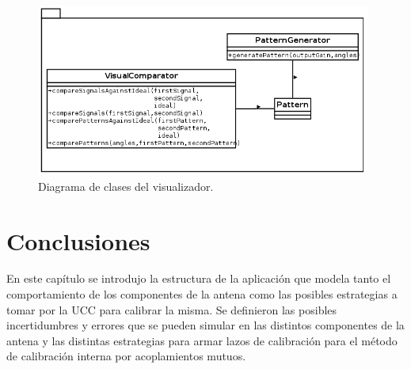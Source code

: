 \begin{figure}[H]
 \centering
 \includegraphics[width=11cm]{gfx/visualPackage.png}
 \caption{Diagrama de clases del visualizador.}
 \label{fig:visualPackage}
\end{figure}


\section{Conclusiones}

En este capítulo se introdujo la estructura de la aplicación que modela tanto el comportamiento de los componentes de la antena
como las posibles estrategias a tomar por la UCC para calibrar la misma. Se definieron las posibles incertidumbres y errores que
se pueden simular en las distintos componentes de la antena y las distintas estrategias para armar lazos de calibración para el 
método de calibración interna por acoplamientos mutuos.

